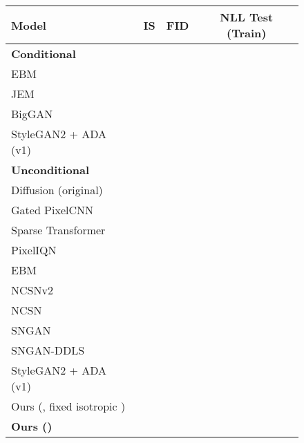 \documentclass{article}
\begin{document}
\begin{figure}
 \begin{minipage}{0.55\textwidth}
 \label{table:cifar10_results}
  \centering \scriptsize
  \vspace{-1em}
  \begin{tabular}{lccc}
    \toprule
    Model & IS & FID & NLL Test (Train) \\
    \midrule
    \textbf{Conditional} \\
    \midrule
    EBM~\citep{du2019implicit} &  &  \\
    JEM~\citep{grathwohl2020your} &  &  \\
    BigGAN~\citep{brock2018large} &  &  \\
    StyleGAN2 + ADA (v1)~\cite{karras2020training} &  &  \\
    \midrule
    \textbf{Unconditional} \\
    \midrule
    Diffusion (original)~\citep{sohl2015deep} & & &  \\
    Gated PixelCNN~\citep{oord2016conditional} &  &  &   \\
    Sparse Transformer~\citep{child2019generating} &   &  &  \\
    PixelIQN~\citep{ostrovski2018autoregressive} &  &  \\
    EBM~\citep{du2019implicit} &  &  \\
    NCSNv2~\citep{song2020improved} & &  \\
    NCSN~\citep{song2019generative} &  &  \\
    SNGAN~\citep{miyato2018spectral} &  &  \\
    SNGAN-DDLS~\citep{che2020your} &  &  \\
    StyleGAN2 + ADA (v1)~\citep{karras2020training} &  &  \\
    Ours (, fixed isotropic ) &  &  &   \\
    \textbf{Ours ()} &  &  &  \\ 
    \bottomrule
  \end{tabular}
 \end{minipage}\hfill
 \begin{minipage}{0.4\textwidth}
 \label{table:loss_ablation}
  \centering \scriptsize
  \vspace{-1em}

\end{minipage}
\end{figure}
\end{document}

